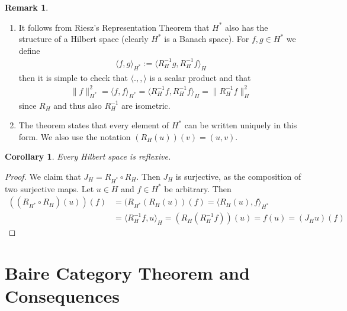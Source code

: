 \documentclass[11pt,a4paper]{article}
\newtheorem{cor}{Corollary}[section]
\theoremstyle{definition}
\newtheorem{rem}{Remark}[section]
\begin{document}
\begin{rem} \ \begin{enumerate}
\item It follows from Riesz's Representation Theorem that $H^*$ also has the structure of a Hilbert space (clearly $H^*$ is a Banach space). For $f,g \in H^*$ we define 
\begin{align*}
\langle f,g \rangle_{H^*} := \langle R_H^{-1} g, R_H^{-1} f \rangle_H
\end{align*}
then it is simple to check that $\langle . , , \rangle$ is a scalar product and that 
\begin{align*}
\|f\|_{H^*}^2 = \langle f,f \rangle_{H^*} = \langle R_H^{-1} f, R_H^{-1} f \rangle_H = \| R_H^{-1} f \|_H^2
\end{align*}
since $R_H$ and thus also $R_H^{-1}$ are isometric. 
\item The theorem states that every element of $H^*$ can be written uniquely in this form. We also use the notation $(R_H(u))(v)=(u,v)$. 
\end{enumerate} 
\end{rem}
\begin{cor} Every Hilbert space is reflexive.
\end{cor}
\begin{proof}
We claim that $J_H = R_{H^*} \circ R_H$. Then $J_H$ is surjective, as the composition of two surjective maps. Let $u \in H$ and $f \in H^*$ be arbitrary. Then 
\begin{align*}
((R_{H^*} \circ R_H)(u))(f)&= (R_{H^*}(R_H(u))(f)= \langle R_H(u),f \rangle_{H^*} \\
 & = \langle R_H^{-1}f, u \rangle_H = ( R_H(R_H^{-1} f))(u)=f(u)=(J_Hu)(f)
\end{align*}
\end{proof}
\section{Baire Category Theorem and Consequences}
\end{document}
